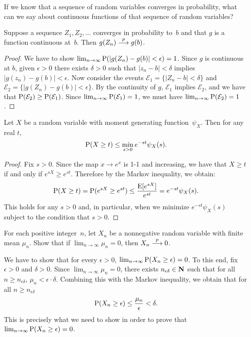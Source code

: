 If we know that a sequence of random variables converges in probability, what 
can we say about continuous functions of that sequence of random variables?
\begin{theorem}
Suppose a sequence $Z_1, Z_2, \ldots$ converges in probability to~$b$ and 
that $g$ is a function continuous at~$b$. Then $g(Z_n) \stackrel{p}{\longrightarrow} g(b)$.
\end{theorem} 
\begin{proof}
We have to show $\lim_{n \to \infty} \operatorname{P} (|g(Z_n) - g(b)| < \epsilon) = 1$. 
Since $g$ is continuous at $b$, given $\epsilon > 0$ there exists $\delta > 0$
such that $|z_n - b| < \delta$ implies $|g(z_n) -  g(b)| < \epsilon$. Now consider
the events $\mathcal{E}_1 = \{ |Z_n - b| < \delta \}$ and 
$\mathcal{E}_2 = \{|g(Z_n) - g(b)| < \epsilon\}$. By the continuity of $g$, 
$\mathcal{E}_1$ implies $\mathcal{E}_2$, and we have that 
$\operatorname{P} (\mathcal{E}_2) \geq \operatorname{P} (\mathcal{E}_1)$. 
Since $\lim_{n \to \infty} \operatorname{P} (\mathcal{E}_1) = 1$, we must have  
$\lim_{n \to \infty} \operatorname{P} (\mathcal{E}_2) = 1$. 
\end{proof}

\begin{theorem}
Let $X$ be a random variable with moment generating function~$\psi_X$. 
Then for any real $t$,
\begin{equation} \label{ineq:chernoff}
\operatorname{P} (X \geq t) \leq \min_{s > 0} e^{- st} \psi_X(s).
\end{equation}
\end{theorem}
\begin{proof}
Fix $s > 0$. Since the map $x \longrightarrow e^x$ is 1-1 and increasing, we 
have that $X \geq t$ if and only if $e^{sX} \geq e^{st}$. Therefore by the 
Markov inequality, we obtain:
\[
    \operatorname{P} (X \geq t) = \operatorname{P} (e^{sX} \geq e^{st}) 
        \leq \frac{\operatorname{E} [e^{sX}]}{e^{st}}
        = e^{- s t} \psi_X(s).
\] 
This holds for any $s > 0$ and, in particular, when we minimize 
$e^{- s t} \psi_X(s)$ subject to the condition that $s > 0$.
\end{proof}


\begin{example}
For each positive integer~$n$, let $X_n$ be a nonnegative random variable 
with finite mean $\mu_n$. Show that if $\lim_{n \to \infty} \mu_n = 0$, 
then $X_n \stackrel{p}{\longrightarrow} 0$.
\begin{solution}
We have to show that for every $\epsilon > 0$, 
$\lim_{n \to \infty} \operatorname{P} (X_n \geq \epsilon) = 0$. To this end, 
fix $\epsilon > 0$ and $\delta > 0$. Since $\lim_{n \to \infty} \mu_n = 0$, there
exists $n_{\epsilon \delta} \in \mathbf{N}$ such that for all $n \geq n_{\epsilon \delta}$, 
$\mu_n < \epsilon \cdot \delta$. Combining this with the 
Markov inequality, we obtain that for all $n \geq n_{\epsilon \delta}$ 
\[
    \operatorname{P} (X_n \geq \epsilon) \leq \frac{\mu_n}{\epsilon} < \delta.
\]
This is precisely what we need to show in order to prove that 
$\lim_{n \to \infty} \operatorname{P} (X_n \geq \epsilon) = 0$.
\end{solution}
\eop 
\end{example}

